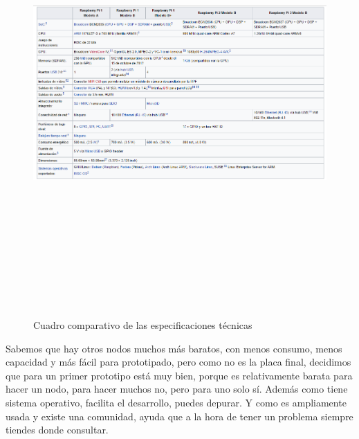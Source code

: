  \begin{figure}[htb]
	
	\begin{center}
		\includegraphics[width=17cm,height=17cm]{figures/Cuadro_Tipos_Raspberry.png}
		\caption{Cuadro comparativo de las especificaciones técnicas}
	\end{center}
	
	\label{figure4}
\end{figure}


Sabemos que hay otros nodos muchos más baratos, con menos consumo, menos capacidad y más fácil para prototipado, pero como no es la placa final, decidimos que para un primer prototipo está muy bien, porque es relativamente barata para hacer un nodo, para hacer muchos no, pero para uno solo sí. Además como tiene sistema operativo, facilita el desarrollo, puedes depurar. Y como es ampliamente usada y existe una comunidad, ayuda que a la hora de tener un problema siempre tiendes donde consultar.



